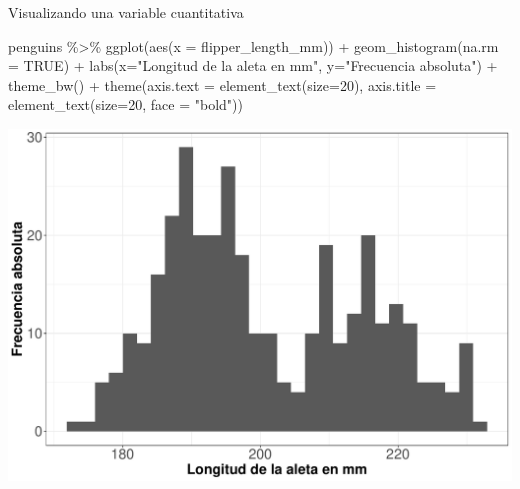 \documentclass[
  ignorenonframetext,
  aspectratio=169]{beamer}
\newenvironment{Shaded}{\begin{snugshade}}{\end{snugshade}}
\newcommand{\AttributeTok}[1]{\textcolor[rgb]{0.77,0.63,0.00}{#1}}
\newcommand{\ConstantTok}[1]{\textcolor[rgb]{0.00,0.00,0.00}{#1}}
\newcommand{\DecValTok}[1]{\textcolor[rgb]{0.00,0.00,0.81}{#1}}
\newcommand{\FunctionTok}[1]{\textcolor[rgb]{0.00,0.00,0.00}{#1}}
\newcommand{\NormalTok}[1]{#1}
\newcommand{\SpecialCharTok}[1]{\textcolor[rgb]{0.00,0.00,0.00}{#1}}
\newcommand{\StringTok}[1]{\textcolor[rgb]{0.31,0.60,0.02}{#1}}
\begin{document}
\begin{frame}[fragile]{Visualizando una variable cuantitativa}
\protect\hypertarget{visualizando-una-variable-cuantitativa}{}
\begin{Shaded}
\begin{Highlighting}[]
\NormalTok{penguins }\SpecialCharTok{\%\textgreater{}\%} 
  \FunctionTok{ggplot}\NormalTok{(}\FunctionTok{aes}\NormalTok{(}\AttributeTok{x =}\NormalTok{ flipper\_length\_mm)) }\SpecialCharTok{+}
  \FunctionTok{geom\_histogram}\NormalTok{(}\AttributeTok{na.rm =} \ConstantTok{TRUE}\NormalTok{) }\SpecialCharTok{+}
    \FunctionTok{labs}\NormalTok{(}\AttributeTok{x=}\StringTok{"Longitud de la aleta en mm"}\NormalTok{, }
         \AttributeTok{y=}\StringTok{"Frecuencia absoluta"}\NormalTok{) }\SpecialCharTok{+} 
  \FunctionTok{theme\_bw}\NormalTok{() }\SpecialCharTok{+}
  \FunctionTok{theme}\NormalTok{(}\AttributeTok{axis.text =} \FunctionTok{element\_text}\NormalTok{(}\AttributeTok{size=}\DecValTok{20}\NormalTok{),}
        \AttributeTok{axis.title =} \FunctionTok{element\_text}\NormalTok{(}\AttributeTok{size=}\DecValTok{20}\NormalTok{, }\AttributeTok{face =} \StringTok{"bold"}\NormalTok{))}
\end{Highlighting}
\end{Shaded}

\begin{center}\includegraphics[width=0.6\linewidth,height=0.4\textheight]{tidyverse_AD_files/figure-beamer/unnamed-chunk-132-1} \end{center}
\end{frame}
\end{document}
